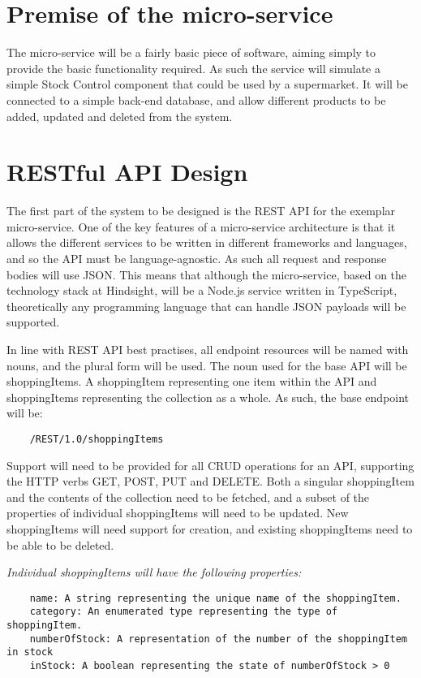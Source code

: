 \section{Premise of the micro-service}
The micro-service will be a fairly basic piece of software, aiming simply to provide the basic functionality required. As such the service will simulate a simple Stock Control component that could be used by a supermarket. It will be connected to a simple back-end database, and allow different products to be added, updated and deleted from the system. 

\section{RESTful API Design}
The first part of the system to be designed is the REST API for the exemplar micro-service. One of the key features of a micro-service architecture is that it allows the different services to be written in different frameworks and languages, and so the API must be language-agnostic. As such all request and response bodies will use JSON. This means that although the micro-service, based on the technology stack at Hindsight, will be a Node.js service written in TypeScript, theoretically any programming language that can handle JSON payloads will be supported.

In line with REST API best practises, all endpoint resources will be named with nouns, and the plural form will be used. The noun used for the base API will be shoppingItems. A shoppingItem representing one item within the API and shoppingItems representing the collection as a whole. 
As such, the base endpoint will be:
\begin{verbatim}
    /REST/1.0/shoppingItems
\end{verbatim}

Support will need to be provided for all CRUD operations for an API, supporting the HTTP verbs GET, POST, PUT and DELETE. Both a singular shoppingItem and the contents of the collection need to be fetched, and a subset of the properties of individual shoppingItems will need to be updated. New shoppingItems will need support for creation, and existing shoppingItems need to be able to be deleted.

\emph{Individual shoppingItems will have the following properties:}
\begin{verbatim}
    name: A string representing the unique name of the shoppingItem.
    category: An enumerated type representing the type of shoppingItem.
    numberOfStock: A representation of the number of the shoppingItem in stock
    inStock: A boolean representing the state of numberOfStock > 0
\end{verbatim}

